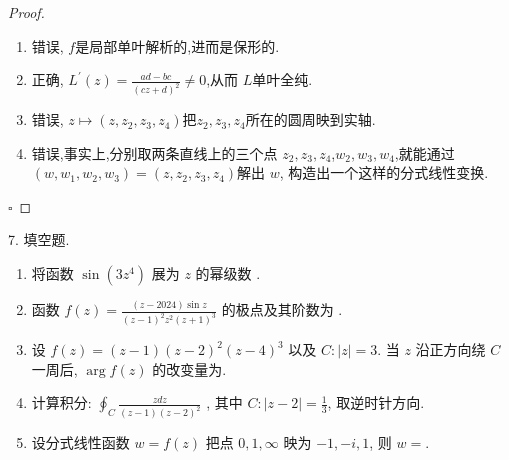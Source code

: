 \documentclass[../../复变函数.tex]{subfiles}
\begin{document}
\begin{proof}
    \begin{enumerate}
        \item 错误, \(  f  \)是局部单叶解析的,进而是保形的. 
        \item  正确, \(  L^{\prime} \left( z \right)= \frac{ad-bc }{\left( cz+ d \right)^{2}  } \neq 0   \),从而 \(  L  \)单叶全纯.  
        \item 错误, \(  z \mapsto \left( z,z_2,z_3,z_4 \right)   \)把\(  z_2,z_3,z_4  \)所在的圆周映到实轴.   
        \item 错误,事实上,分别取两条直线上的三个点 \(  z_2,z_3,z_4  \),\(  w_2,w_3,w_4  \),就能通过 \(  \left( w,w_1,w_2,w_3 \right)= \left( z,z_2,z_3,z_4 \right)    \)解出 \(  w  \), 构造出一个这样的分式线性变换.   
    \end{enumerate}
    

    \hfill $\square$
\end{proof}
\begin{problem}
7. 填空题.
\begin{enumerate}
    \item 将函数 $\sin(3z^4)$ 展为 $z$ 的幂级数 .
    \item 函数 $f(z) = \frac{(z-2024)\sin z}{(z-1)^2 z^2 (z+1)^3}$ 的极点及其阶数为 .
    \item 设 $f(z) = (z-1)(z-2)^2 (z-4)^3$ 以及 $C: |z|=3$. 当 $z$ 沿正方向绕 $C$ 一周后, $\arg f(z)$ 的改变量为.
    \item 计算积分: $\oint_C \frac{zdz}{(z-1)(z-2)^2}$ , 其中 $C: |z-2|=\frac{1}{3}$, 取逆时针方向.
    \item 设分式线性函数 $w=f(z)$ 把点 $0, 1, \infty$ 映为 $-1, -i, 1$, 则 $w=$.
\end{enumerate}
\end{problem}
\end{document}
